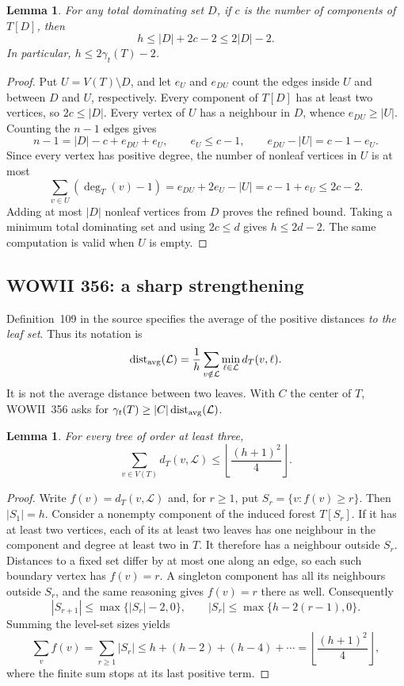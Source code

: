\documentclass[11pt,a4paper]{article}
\newtheorem{lemma}[theorem]{Lemma}
\theoremstyle{remark}
\begin{document}
\begin{lemma}\label{r3tree:lem:internal}
For any total dominating set $D$, if $c$ is the number of components
of $T[D]$, then
\begin{equation}\label{r3tree:eq:internal}
h\le |D|+2c-2\le2|D|-2.
\end{equation}
In particular, $h\le2\gamma_t(T)-2$.
\end{lemma}
\begin{proof}
Put $U=V(T)\setminus D$, and let $e_U$ and $e_{DU}$ count the edges
inside $U$ and between $D$ and $U$, respectively.  Every component
of $T[D]$ has at least two vertices, so $2c\le |D|$.
Every vertex of $U$ has a neighbour in $D$, whence $e_{DU}\ge |U|$.
Counting the $n-1$ edges gives
\[
n-1=|D|-c+e_{DU}+e_U,
\qquad e_U\le c-1,
\qquad e_{DU}-|U|=c-1-e_U.
\]
Since every vertex has positive degree, the number of nonleaf
vertices in $U$ is at most
\[
\sum_{v\in U}(\deg_T(v)-1)
 =e_{DU}+2e_U-|U|
 =c-1+e_U\le2c-2.
\]
Adding at most $|D|$ nonleaf vertices from $D$ proves the refined
bound.  Taking a minimum total dominating set and using $2c\le d$
gives $h\le2d-2$.  The same computation is valid when $U$ is empty.
\end{proof}

\subsection{WOWII 356: a sharp strengthening}
\label{r3tree:sec:356}

Definition~109 in the source specifies the average of the positive
distances \emph{to the leaf set}.  Thus its notation is
\[
\operatorname{dist}_{\rm avg}(\mathcal L)
 =\frac1h\sum_{v\notin\mathcal L}
       \min_{\ell\in\mathcal L}d_T(v,\ell).
\]
It is not the average distance between two leaves.  With $C$ the
center of $T$, WOWII~356 asks for
$\gamma_t(T)\ge |C|\operatorname{dist}_{\rm avg}(\mathcal L)$.

\begin{lemma}\label{r3tree:lem:leafsum}
For every tree of order at least three,
\[
\sum_{v\in V(T)}d_T(v,\mathcal L)
 \le\left\lfloor\frac{(h+1)^2}{4}\right\rfloor.
\]
\end{lemma}
\begin{proof}
Write $f(v)=d_T(v,\mathcal L)$ and, for $r\ge1$, put
$S_r=\{v:f(v)\ge r\}$.  Then $|S_1|=h$.
Consider a nonempty component of the induced forest $T[S_r]$.
If it has at least two vertices, each of its at least two leaves
has one neighbour in the component and degree at least two in $T$.
It therefore has a neighbour outside $S_r$.  Distances to a fixed
set differ by at most one along an edge, so each such boundary
vertex has $f(v)=r$.  A singleton component has all its neighbours
outside $S_r$, and the same reasoning gives $f(v)=r$ there as well.
Consequently
\[
|S_{r+1}|\le\max\{|S_r|-2,0\},
\qquad |S_r|\le\max\{h-2(r-1),0\}.
\]
Summing the level-set sizes yields
\[
\sum_v f(v)=\sum_{r\ge1}|S_r|
 \le h+(h-2)+(h-4)+\cdots
 =\left\lfloor\frac{(h+1)^2}{4}\right\rfloor,
\]
where the finite sum stops at its last positive term.
\end{proof}
\end{document}
